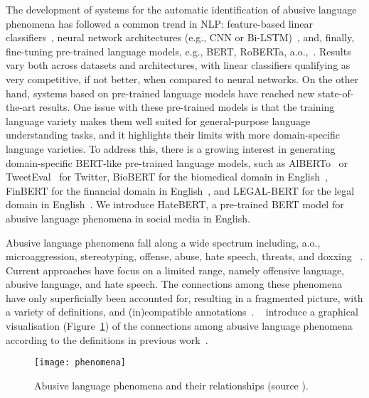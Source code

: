 \documentclass[11pt]{article}
\begin{document}
The development of systems for the automatic identification of abusive language phenomena has followed a common trend in NLP: feature-based linear classifiers~\cite{waseem-hovy:2016:N16-2,ribeiro2018characterizing,ibrohim2019multi}, neural network architectures (e.g., CNN or Bi-LSTM)~\cite{kshirsagar-etal-2018-predictive,mishra-etal-2018-neural,mitrovic-etal-2019-nlpup,sigurbergsson2020offensive}, and, finally, fine-tuning pre-trained language models, e.g., BERT, RoBERTa, a.o.,~\cite{liu-etal-2019-nuli,swamy-etal-2019-studying}. Results vary both across datasets and architectures, with linear classifiers qualifying as very competitive, if not better, when compared to neural networks. On the other hand, systems based on pre-trained language models have reached new state-of-the-art results. One issue with these pre-trained models is that the training language variety makes them well suited for general-purpose language understanding tasks, and it highlights their limits with more domain-specific language varieties. To address this, there is a growing interest in generating domain-specific BERT-like pre-trained language models, such as AlBERTo~\cite{DBLP:conf/aiia/PolignanoBGS19} or TweetEval~\cite{barbieri-etal-2020-tweeteval} for Twitter, BioBERT for the biomedical domain in English~\cite{biobert}, FinBERT for the financial domain in English~\cite{finbert}, and LEGAL-BERT for the legal domain in English~\cite{chalkidis-etal-2020-legal}. We introduce HateBERT, a pre-trained BERT model for abusive language phenomena in social media in English.


Abusive language phenomena fall along a wide spectrum including, a.o., microaggression, stereotyping, offense, abuse, hate speech, threats, and doxxing ~\cite{jurgens-etal-2019-just}. Current approaches have focus on a limited range, namely offensive language, abusive language, and hate speech. The connections among these phenomena have only superficially been accounted for, resulting in a fragmented picture, with a variety of definitions, and (in)compatible annotations~\cite{waseem2017understanding}. ~ introduce a graphical visualisation (Figure~\ref{fig:phenomena}) of the connections among abusive language phenomena according to the definitions in previous work~\cite{waseem-hovy:2016:N16-2,fortuna2018survey,malmasi2018challenges,basile-etal-2019-semeval,zampieri-etal-2019-semeval}.  
\begin{figure}[!thb]
    \centering
    \texttt{[image: phenomena]}
    \caption{Abusive language phenomena and their relationships (source ).}
    \label{fig:phenomena}
\end{figure}
\end{document}
